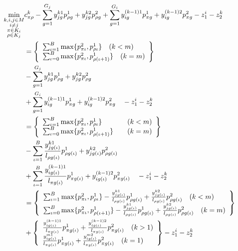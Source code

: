 \documentclass{article}
\begin{document}
\begin{align*}
    \min_{\substack{k,i,j\in M \\ i\neq j \\ \pi\in K_i \\ \rho\in K_j}} & c_{\pi\rho}^k
    - \sum_{g=1}^{G_j} y_{jg}^{k1} p_{\rho g}^1 + y_{jg}^{k2} p_{\rho g}^2
    + \sum_{g=1}^{G_i} y_{ig}^{(k-1)1} p_{\pi g}^1 + y_{ig}^{(k-1)2} p_{\pi g}^2
    - z_1^i - z_2^k \\
    &= \left\{\begin{array}{l l}
        \sum_{\iota=1}^{B} \max\{p_{\pi\iota}^2,p_{\rho\iota}^1\} \quad (k<m)\\
        \sum_{\iota=0}^{B} \max\{p_{\pi\iota}^2,p_{\rho(\iota+1)}^1\} \quad (k=m)
    \end{array}\right\} \notag \\
    &- \sum_{g=1}^{G_j} y_{jg}^{k1} p_{\rho g}^1 + y_{jg}^{k2} p_{\rho g}^2 \notag \\
    &+ \sum_{g=1}^{G_i} y_{ig}^{(k-1)1} p_{\pi g}^1 + y_{ig}^{(k-1)2} p_{\pi g}^2
    \quad - z_1^i - z_2^k \\
    &= \left\{\begin{array}{l l}
        \sum_{\iota=1}^{B} \max\{p_{\pi\iota}^2,p_{\rho\iota}^1\} \quad &(k<m)\\
        \sum_{\iota=0}^{B} \max\{p_{\pi\iota}^2,p_{\rho(\iota+1)}^1\} \quad &(k=m)
    \end{array}\right\} \notag \\
    &- \sum_{\iota=1}^{B} \frac{y_{jg(\iota)}^{k1}}{l_{\rho g(\iota)}} p_{\rho g(\iota)}^1 + y_{jg(\iota)}^{k2} p_{\rho g(\iota)}^2 \notag \\
    &+ \sum_{\iota=1}^{B} \frac{y_{ig(\iota)}^{(k-1)1}}{l_{\pi g(\iota)}} p_{\pi g(\iota)}^1 + y_{ig(\iota)}^{(k-1)2} p_{\pi g(\iota)}^2 
    \quad - z_1^i - z_2^k \\
    &= \left\{\begin{array}{l l}
        \sum_{\iota=1}^{B} \max\{p_{\pi\iota}^2,p_{\rho\iota}^1\} - 
            \frac{y_{jg(\iota)}^{k1}}{l_{\rho g(\iota)}} p_{\rho g(\iota)}^1 + \frac{y_{jg(\iota)}^{k2}}{l_{\rho g(\iota)}} p_{\rho g(\iota)}^2 \quad (k<m)\\
        \sum_{\iota=0}^{B} \max\{p_{\pi\iota}^2,p_{\rho(\iota+1)}^1\} - 
            \frac{y_{jg(\iota)}^{k1}}{l_{\rho g(\iota)}} p_{\rho g(\iota)}^1 + \frac{y_{jg(\iota)}^{k2}}{l_{\rho g(\iota)}} p_{\rho g(\iota)}^2 \quad (k=m)
    \end{array}\right\} \notag \\
    &+ \left\{\begin{array}{l l}
    \frac{y_{ig(\iota)}^{(k-1)1}}{l_{\pi g(\iota)}} p_{\pi g(\iota)}^1 + \frac{y_{ig(\iota)}^{(k-1)2}}{l_{\pi g(\iota)}} p_{\pi g(\iota)}^2 \quad (k>1) \\
        \frac{y_{ig(\iota)}^{m1}}{l_{\pi g(\iota)}} p_{\pi g(\iota)}^1 + \frac{y_{ig(\iota)}^{m2}}{l_{\pi g(\iota)}} p_{\pi g(\iota)}^2 \quad (k=1)
    \end{array}\right\}
    - z_1^i - z_2^k 
\end{align*}%
\end{document}
